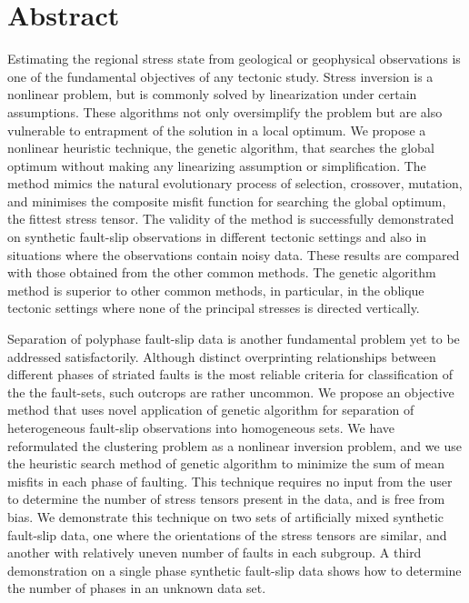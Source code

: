 \documentclass[12pt, oneside]{book}
\begin{document}
\vfill\vfill\vfill\vfill\vfill\vfill\null
\clearpage  %

\onehalfspacing
\chapter{Abstract}
Estimating the regional stress state from geological or geophysical observations is one of the fundamental objectives of any tectonic study. Stress inversion is a nonlinear problem, but is commonly solved by linearization under certain assumptions. These algorithms not only oversimplify the problem but are also vulnerable to entrapment of the solution in a local optimum. We propose a nonlinear heuristic technique, the genetic algorithm, that searches the global optimum without making any linearizing assumption or simplification. The method mimics the natural evolutionary process of selection, crossover, mutation, and minimises the composite misfit function for searching the global optimum, the fittest stress tensor. The validity of the method is successfully demonstrated on synthetic fault-slip observations in different tectonic settings and also in situations where the observations contain noisy data. These results are compared with those obtained from the other common methods. The genetic algorithm method is superior to other common methods, in particular, in the oblique tectonic settings where none of the principal stresses is directed vertically.

Separation of polyphase fault-slip data is another fundamental problem yet to be addressed satisfactorily. Although distinct overprinting relationships between different phases of striated faults is the most reliable criteria for classification of the the fault-sets, such outcrops are rather uncommon. We propose an objective method that uses novel application of genetic algorithm for separation of heterogeneous fault-slip observations into homogeneous sets. We have reformulated the clustering problem as a nonlinear inversion problem, and we use the heuristic search method of genetic algorithm to minimize the sum of mean misfits in each phase of faulting. This technique requires no input from the user to determine the number of stress tensors present in the data, and is free from bias. We demonstrate this technique on two sets of artificially mixed synthetic fault-slip data, one where the orientations of the stress tensors are similar, and another with relatively uneven number of faults in each subgroup. A third demonstration on a single phase synthetic fault-slip data shows how to determine the number of phases in an unknown data set. 
\tableofcontents
\end{document}
